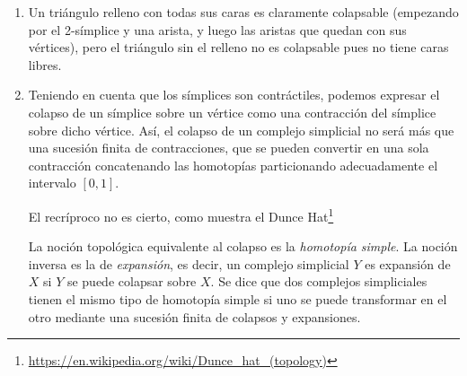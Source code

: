 \documentclass[twoside]{article}
\begin{document}
\begin{solucion}
\begin{enumerate}
\item Un triángulo relleno con todas sus caras es claramente colapsable (empezando por el 2-símplice y una arista, y luego las aristas que quedan con sus vértices), pero el triángulo sin el relleno no es colapsable pues no tiene caras libres.

\item Teniendo en cuenta que los símplices son contráctiles, podemos expresar el colapso de un símplice sobre un vértice como una contracción del símplice sobre dicho vértice. Así, el colapso de un complejo simplicial no será más que una sucesión finita de contracciones, que se pueden convertir en una sola contracción concatenando las homotopías particionando adecuadamente el intervalo $[0,1]$.

El recríproco no es cierto, como muestra el Dunce Hat\footnote{\url{https://en.wikipedia.org/wiki/Dunce_hat_(topology)}}

\begin{nota}
La noción topológica equivalente al colapso es la \emph{homotopía simple}. La noción inversa es la de \emph{expansión}, es decir, un complejo simplicial $Y$ es expansión de $X$ si $Y$ se puede colapsar sobre $X$. Se dice que dos complejos simpliciales tienen el mismo tipo de homotopía simple si uno se puede transformar en el otro mediante una sucesión finita de colapsos y expansiones. 
\end{nota}
\end{enumerate}
\end{solucion}

\newpage
\end{document}
